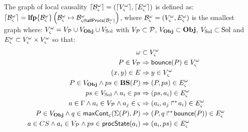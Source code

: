 \begin{definition}
\label{def:glc}
  The graph of local causality $\cwB = (\Bv, \Be)$ is defined as: $\cwB = \lfp{\aB^\w_\ctx}{\myB}{\aB^\w_{\ctx \Cap \allprocs(\myB)}}$,
  where $\myB = (\cwV, \cwE)$ is the smallest graph where: $\cwV = \VProc \cup \VObj \cup \VSol$ with $\VProc \subset \PHproc$, $\VObj \subset \Obj$, $\VSol \subset \Sol$ and $\cwE \subset \cwV \times \cwV$ so that:
  \begin{align}
    \w &\subset \cwV \label{eq:Vw} \\
    P \in \VProc &\Rightarrow \PHbounce(P) \in \cwV \label{eq:Vproc} \\
    (x, y) \in \E &\Rightarrow y \in \cwV \label{eq:VE} \\
    P \in \VObj \wedge ps \in \BS(P) &\Rightarrow (P, ps) \in \cwE \label{eq:ESol1} \\
    ps \in \VSol \wedge a_i \in ps &\Rightarrow (ps, a_i) \in \cwE \label{eq:ESol2} \\
    a \in \components \wedge a_i \in \VProc \wedge a_j \in \ctx &\Rightarrow (a_i, \PHobjp{a}{j}{i}) \in \cwE \label{eq:EReq} \\
    P \in \VObj \wedge q \in \gCont_\ctx(\PHsort(P), P) &\Rightarrow (P, \PHobj{q}{\PHbounce(P)}) \in \cwE \label{eq:ECont} \\
    a \in \cs \wedge a_i \in \VProc \wedge ps \in \csState(a_i) &\Rightarrow (a_i, ps) \in \cwE \label{eq:EPrio}
  \end{align}
\end{definition}

